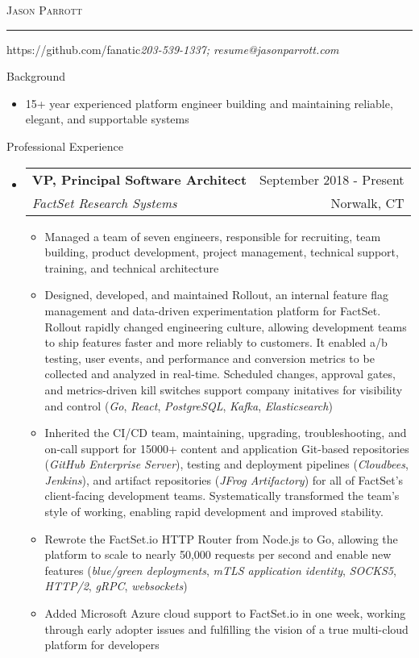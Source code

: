 \documentclass[letterpaper,10pt]{article}
\makeatletter
\newcommand{\name}{Jason Parrott}
\newcommand{\addr}{https://github.com/fanatic}
\newcommand{\phone}{203-539-1337}
\newcommand{\email}{resume@jasonparrott.com}
\newcommand{\bigname}[1]{
	\begin{center}\fontfamily{phv}\selectfont\Huge\scshape#1\end{center}
}
\newenvironment{ressection}[1]{
	\vspace{4pt}
	{\fontfamily{phv}\selectfont\Large#1}
	\begin{itemize}
	\vspace{3pt}
}{
	\end{itemize}
}
\newcommand{\ressubitem}[1]{
	\vspace{-1pt}
	\item \begin{flushleft} #1 \end{flushleft}
}
\newcommand{\resbigitem}[4]{
	\vspace{-5pt}
	\item
	\begin{tabular*}{6in}{l@{\extracolsep{\fill}}r}
		\textbf{#1} & #2 \\
		\textit{#3} & #4\\
	\end{tabular*}
}
\newenvironment{ressubsec}[4]{
	\resbigitem{#1}{#2}{#3}{#4}
	\vspace{-2pt}
	\begin{itemize}
}{
	\end{itemize}
}
\makeatother
\begin{document}
\bigname{\name}

\vspace{-8pt} \rule{\textwidth}{1pt}

\vspace{-1pt} {\small \addr \hfill \itshape\phone; \email}

\vspace{8 pt}

\begin{ressection}{Background}
	\item[]
	15+ year experienced platform engineer building and maintaining reliable, elegant, and supportable systems
\end{ressection}

\begin{ressection}{Professional Experience}
	\begin{ressubsec}{VP, Principal Software Architect}{September 2018 - Present}{FactSet Research Systems}{Norwalk, CT}
		\ressubitem{Managed a team of seven engineers, responsible for recruiting, team building, product development, project management, technical support, training, and technical architecture}
		\ressubitem{Designed, developed, and maintained Rollout, an internal feature flag management and data-driven experimentation platform for FactSet.  Rollout rapidly changed engineering culture, allowing development teams to ship features faster and more reliably to customers.  It enabled a/b testing, user events, and performance and conversion metrics to be collected and analyzed in real-time.  Scheduled changes, approval gates, and metrics-driven kill switches support company initatives for visibility and control (\textit{Go}, \textit{React}, \textit{PostgreSQL}, \textit{Kafka}, \textit{Elasticsearch})}
		\ressubitem{Inherited the CI/CD team, maintaining, upgrading, troubleshooting, and on-call support for 15000+ content and application Git-based repositories (\textit{GitHub Enterprise Server}), testing and deployment pipelines (\textit{Cloudbees}, \textit{Jenkins}), and artifact repositories (\textit{JFrog Artifactory}) for all of FactSet's client-facing development teams.  Systematically transformed the team's style of working, enabling rapid development and improved stability.}
		\ressubitem{Rewrote the FactSet.io HTTP Router from Node.js to Go, allowing the platform to scale to nearly 50,000 requests per second and enable new features (\textit{blue/green deployments}, \textit{mTLS application identity}, \textit{SOCKS5}, \textit{HTTP/2}, \textit{gRPC}, \textit{websockets})}
		\ressubitem{Added Microsoft Azure cloud support to FactSet.io in one week, working through early adopter issues and fulfilling the vision of a true multi-cloud platform for developers}

\end{ressubsec}
\end{ressection}
\end{document}
